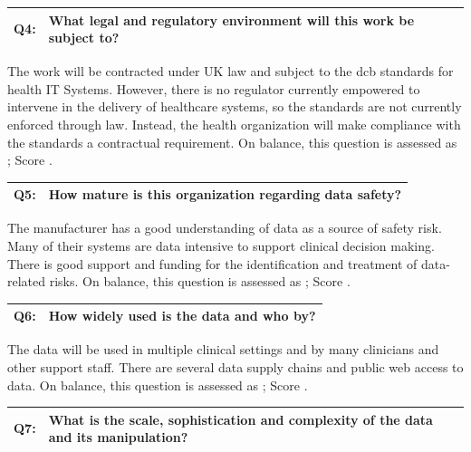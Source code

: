\addtocounter{table}{-1} %
\begin{longtable*}[H]
	{|L{}|L{}|}
	\hline
	Q4: & What legal and regulatory environment will this work be subject to?\\
	\hline
\end{longtable*}

The work will be contracted under UK law and subject to the \gls{dcb}
standards for health IT Systems. However, there is no regulator currently empowered to intervene in the delivery of healthcare systems, so the standards are not currently enforced through law. Instead, the health organization will make compliance with the standards a contractual requirement. On balance, this question is assessed as ; Score .

\addtocounter{table}{-1} %
\begin{longtable*}[H]
	{|L{}|L{}|}
	\hline
	Q5: & How mature is this organization regarding data safety?\\
	\hline
\end{longtable*}

The manufacturer has a good understanding of data as a source of safety risk. Many of their systems are data intensive to support clinical decision making. There is good support and funding for the identification and treatment of data-related risks. On balance, this question is assessed as ; Score .

\addtocounter{table}{-1} %
\begin{longtable*}[H]
	{|L{}|L{}|}
	\hline
	Q6: & How widely used is the data and who by?\\
	\hline
\end{longtable*}

The data will be used in multiple clinical settings and by many clinicians and other support staff. There are several data supply chains and public web access to data. On balance, this question is assessed as ; Score .

\addtocounter{table}{-1} %
\begin{longtable*}[H]
	{|L{}|L{}|}
	\hline
	Q7: & What is the scale, sophistication and complexity of the data and its manipulation?\\
	\hline
\end{longtable*}

